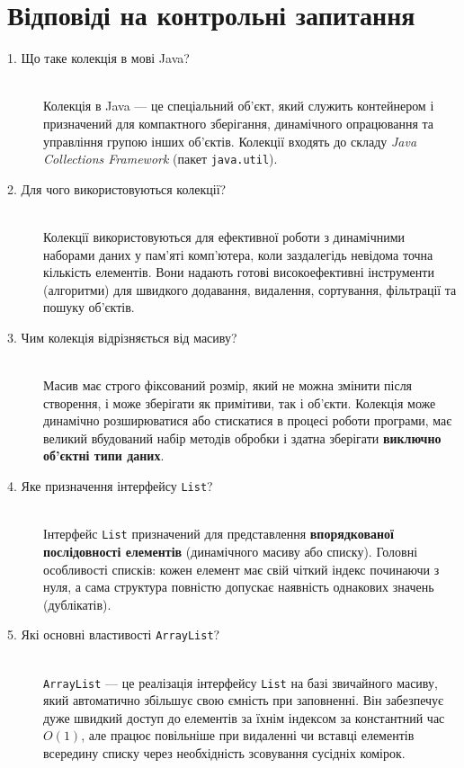 \section{Відповіді на контрольні запитання}

\begin{description}
    \item[1. Що таке колекція в мові Java?] ~\\
    Колекція в Java — це спеціальний об'єкт, який служить контейнером і призначений для компактного зберігання, динамічного опрацювання та управління групою інших об'єктів. Колекції входять до складу \textit{Java Collections Framework} (пакет \texttt{java.util}).

    \item[2. Для чого використовуються колекції?] ~\\
    Колекції використовуються для ефективної роботи з динамічними наборами даних у пам'яті комп'ютера, коли заздалегідь невідома точна кількість елементів. Вони надають готові високоефективні інструменти (алгоритми) для швидкого додавання, видалення, сортування, фільтрації та пошуку об'єктів.

    \item[3. Чим колекція відрізняється від масиву?] ~\\
    Масив має строго фіксований розмір, який не можна змінити після створення, і може зберігати як примітиви, так і об'єкти. Колекція може динамічно розширюватися або стискатися в процесі роботи програми, має великий вбудований набір методів обробки і здатна зберігати \textbf{виключно об'єктні типи даних}.

    \item[4. Яке призначення інтерфейсу \texttt{List}?] ~\\
    Інтерфейс \texttt{List} призначений для представлення \textbf{впорядкованої послідовності елементів} (динамічного масиву або списку). Головні особливості списків: кожен елемент має свій чіткий індекс починаючи з нуля, а сама структура повністю допускає наявність однакових значень (дублікатів).

    \item[5. Які основні властивості \texttt{ArrayList}?] ~\\
    \texttt{ArrayList} — це реалізація інтерфейсу \texttt{List} на базі звичайного масиву, який автоматично збільшує свою ємність при заповненні. Він забезпечує дуже швидкий доступ до елементів за їхнім індексом за константний час $O(1)$, але працює повільніше при видаленні чи вставці елементів всередину списку через необхідність зсовування сусідніх комірок.


\end{description}
